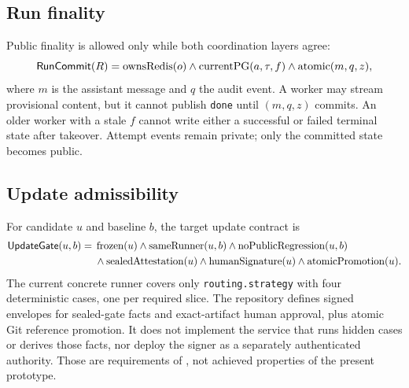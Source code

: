 \subsection{Run finality}

Public finality is allowed only while both coordination layers agree:
\begin{equation}
\mathsf{RunCommit}(R) =
\operatorname{ownsRedis}(o)
\wedge \operatorname{currentPG}(a,\tau,f)
\wedge \operatorname{atomic}(m,q,z),
\end{equation}
where $m$ is the assistant message and $q$ the audit event.  A worker may
stream provisional content, but it cannot publish \texttt{done} until
$(m,q,z)$ commits.  An older worker with a stale $f$ cannot write either a
successful or failed terminal state after takeover.  Attempt events remain
private; only the committed state becomes public.

\subsection{Update admissibility}

For candidate $u$ and baseline $b$, the target update contract is
\begin{align}
\mathsf{UpdateGate}(u,b)={}&
\operatorname{frozen}(u)
\wedge \operatorname{sameRunner}(u,b)
\wedge \operatorname{noPublicRegression}(u,b)\nonumber\\
&\wedge \operatorname{sealedAttestation}(u)
\wedge \operatorname{humanSignature}(u)
\wedge \operatorname{atomicPromotion}(u).
\end{align}
The current concrete runner covers only \texttt{routing.strategy} with four
deterministic cases, one per required slice.  The repository defines signed
envelopes for sealed-gate facts and exact-artifact human approval, plus atomic
Git reference promotion.  It does not implement the service that runs hidden
cases or derives those facts, nor deploy the signer as a separately
authenticated authority.  Those are requirements of \updategate, not achieved
properties of the present prototype.

